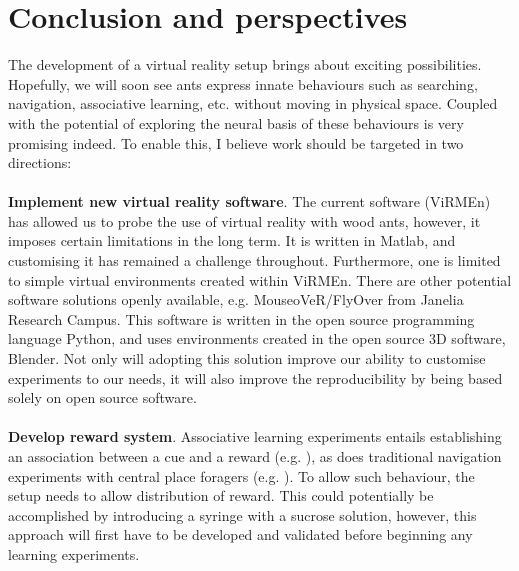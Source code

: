 \chapter{Conclusion and perspectives}
\label{chap:persp}
The development of a virtual reality setup brings about exciting possibilities. Hopefully, we will soon see ants express innate behaviours such as searching, navigation, associative learning, etc. without moving in physical space. Coupled with the potential of exploring the neural basis of these behaviours is very promising indeed.
To enable this, I believe work should be targeted in two directions: \\ \\
\textbf{Implement new virtual reality software}. The current software (ViRMEn) has allowed us to probe the use of virtual reality with wood ants, however, it imposes certain limitations in the long term. It is written in Matlab, and customising it has remained a challenge throughout. Furthermore, one is limited to simple virtual environments created within ViRMEn. There are other potential software solutions openly available, e.g. MouseoVeR/FlyOver from Janelia Research Campus. This software is written in the open source programming language Python, and uses environments created in the open source 3D software, Blender. Not only will adopting this solution improve our ability to customise experiments to our needs, it will also improve the reproducibility by being based solely on open source software. \\ \\
\textbf{Develop reward system}. Associative learning experiments entails establishing an association between a cue and a reward (e.g. \cite{Fernandes2017a}), as does traditional navigation experiments with central place foragers (e.g. \cite{Buehlmann2018}). To allow such behaviour, the setup needs to allow distribution of reward. This could potentially be accomplished by introducing a syringe with a sucrose solution, however, this approach will first have to be developed and validated before beginning any learning experiments. 
